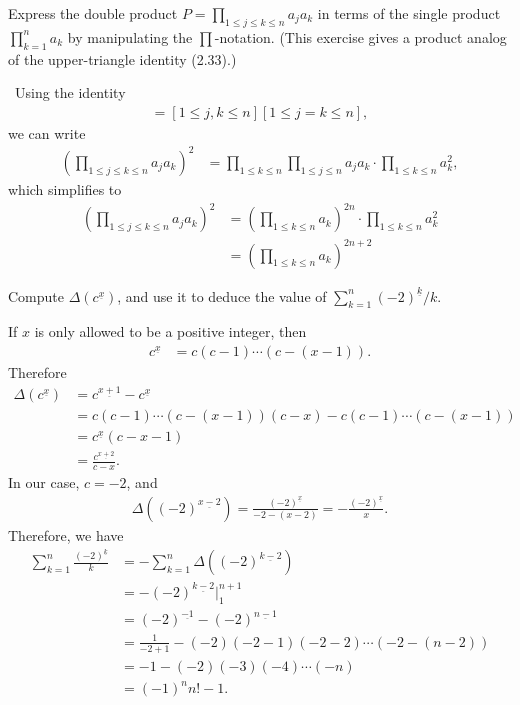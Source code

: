 \documentclass[12pt]{article}
\newenvironment{ex}[2][Exercise]{\begin{trivlist}
		\item[\hskip \labelsep {\bfseries #1}\hskip \labelsep {\bfseries #2.}]}{\end{trivlist}}
\newenvironment{sol}[1][Solution]{\begin{trivlist}
		\item[\hskip \labelsep {\bfseries #1:}]}{\end{trivlist}}
\begin{document}
\begin{ex}{26}
	Express the double product $P=\prod_{1\leq j\leq k\leq n}a_{j}a_k$ in terms of the
	single product $\prod_{k=1}^{n}a_k$ by manipulating the $\prod$-notation. (This
	exercise gives a product analog of the upper-triangle identity (2.33).)
\end{ex}

\begin{sol}
	\
	Using the identity
	\begin{align*}
		[1\leq j\leq k\leq n][1\leq k\leq j\leq n]=[1\leq j,k\leq n][1\leq j=k\leq n],
	\end{align*}
	we can write
	\begin{align*}
		\left(\prod_{1\leq j\leq k\leq n}a_ja_k\right)^2
		&=\prod_{1\leq k\leq n}\prod_{1\leq j\leq n}a_ja_k\cdot \prod_{1\leq k\leq n}a_k^2,
	\end{align*}
	which simplifies to
	\begin{align*}
		\left(\prod_{1\leq j\leq k\leq n}a_ja_k\right)^2
		&=\left(\prod_{1\leq k\leq n}a_k\right)^{2n}\cdot \prod_{1\leq k\leq n}a_k^2\\
		&=\left(\prod_{1\leq k\leq n} a_k\right)^{2n+2}
		\end{align*}
\end{sol}

\begin{ex}{27}
	Compute $\Delta (c^{\underline{x}})$, and use it to deduce the value of
	$\sum_{k=1}^{n}(-2)^{\underline{k}}/k$.
\end{ex}

\begin{sol}
	If $x$ is only allowed to be a positive integer, then
	\begin{align*}
		c^{\underline{x}}&=c(c-1)\cdots (c-(x-1)).
	\end{align*}
	Therefore
	\begin{align*}
		\Delta (c^{\underline{x}})&=c^{\underline{x+1}}-c^{\underline{x}}\\
		&=c(c-1)\cdots(c-(x-1))(c-x)-c(c-1)\cdots(c-(x-1))\\
		&=c^{\underline{x}}(c-x-1)\\
		&=\frac{c^{\underline{x+2}}}{c-x}.
	\end{align*}
	In our case, $c=-2$, and
	\begin{align*}
		\Delta((-2)^{\underline{x-2}})=\frac{(-2)^{\underline{x}}}{-2-(x-2)}=-\frac{(-2)^{\underline{x}}}{x}.
	\end{align*}
	Therefore, we have
	\begin{align*}
		\sum_{k=1}^{n}\frac{(-2)^{\underline{k}}}{k}&=
		-\sum_{k=1}^{n}\Delta \left((-2)^{\underline{k-2}}\right)\\
		&=- (-2)^{\underline{k-2}}\bigg\rvert_{1}^{n+1}\\
		&=(-2)^{\underline{-1}}-(-2)^{\underline{n-1}}\\
		&=\frac{1}{-2+1}-(-2)(-2-1)(-2-2)\cdots(-2-(n-2))\\
		&=-1-(-2)(-3)(-4)\cdots(-n)\\
		&=(-1)^{n}n!-1.
	\end{align*}
\end{sol}
\end{document}

